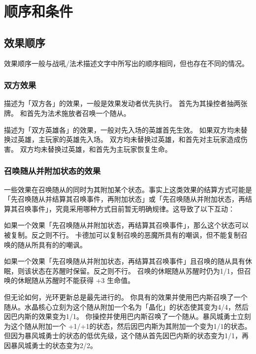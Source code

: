 \chapter{顺序和条件}

\section{效果顺序}

效果顺序一般与战吼/法术描述文字中所写出的顺序相同，但也存在不同的情况。

\subsection{双方效果}

描述为「双方各」的效果，一般是效果发动者优先执行。
\example {}首先为其操控者抽两张牌。
\example {}和首先为法术施放者召唤一个随从。

描述为「双方英雄各」的效果，一般对先入场的英雄首先生效。
\notice 如果双方均未替换过英雄，主玩家的英雄先入场。
\example 双方均未替换过英雄，和首先对主玩家造成伤害。
\example 双方均未替换过英雄，和首先为主玩家恢复生命。

\subsection{召唤随从并附加状态的效果}

一些效果在召唤随从的同时为其附加某个状态。事实上这类效果的结算方式可能是「先召唤随从并结算其召唤事件，再附加状态」或「先召唤随从并附加状态，再结算其召唤事件」，究竟采用哪种方式目前暂无明确规律。这导致了以下互动：

如果一个效果「先召唤随从并附加状态，再结算其召唤事件」，那么这个状态可以被复制。反之则不行。
\example 卡德加可以复制召唤的恶魔所具有的嘲讽，但不能复制召唤的随从所具有的的嘲讽。

如果一个效果「先召唤随从并附加状态，再结算其召唤事件」且召唤的随从具有休眠，则该状态在苏醒时保留。反之则不行。
\example {}召唤的休眠随从苏醒时仍为1/1，但召唤的休眠随从苏醒时不能获得 +3 生命值。

但无论如何，光环更新总是最先进行的。
\example 你具有的效果并使用巴内斯召唤了一个随从。水晶核心立刻为这个随从附加一个名为「晶化」的状态使其变为4/4，然后因巴内斯的效果变为1/1。
\example 你操控并使用巴内斯召唤了一个随从。暴风城勇士立刻为这个随从附加一个 +1/+1的状态，然后因巴内斯为其附加一个变为1/1的状态。但因为暴风城勇士的状态的低优先级，这个随从首先因巴内斯的状态变为1/1，再因暴风城勇士的状态变为2/2。

